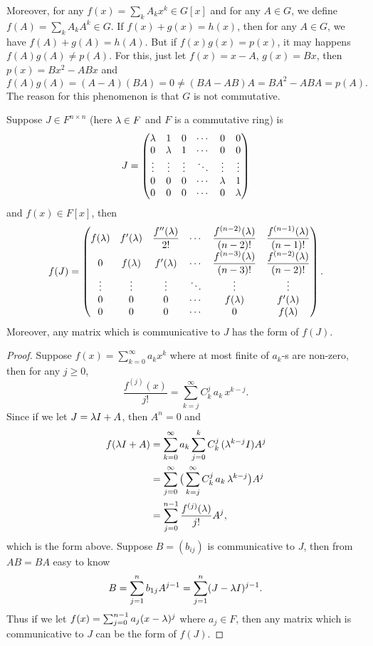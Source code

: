 Moreover, for any $f(x)=\sum_{k} A_kx^k\in G[x]$ and for any $A\in G$, we define $f(A)=\sum_{k} A_k A^k\in G$. If $f(x)+g(x)=h(x)$, then for any $A\in G$, we have $f(A)+g(A)=h(A)$. But if $f(x)g(x)=p(x)$, it may happens $f(A)g(A)\neq p(A)$. For this, just let $f(x)=x-A$, $g(x)=Bx$, then $p(x)=Bx^2-ABx$ and 
\[f(A)g(A)=(A-A)(BA)=0\neq (BA-AB)A=BA^2-ABA=p(A).\]
The reason for this phenomenon is that $G$ is not commutative.
\begin{pro}%
	Suppose $J\in F^{n\times n}$ (here $\lambda\in F$ and $F$ is a commutative ring) is
	\[J=\begin{pmatrix}
	\lambda & 1 & 0 & \cdots & 0 & 0\\
	0   &\lambda& 1 & \cdots & 0 & 0\\
	\vdots   &\vdots& \vdots & \ddots & \vdots & \vdots\\
	0   &0& 0 & \cdots & \lambda & 1\\
	0   &0& 0 & \cdots & 0 & \lambda
	\end{pmatrix}\]
	and $f(x)\in F[x]$, then 
	\[f(J)=\begin{pmatrix}
	f(\lambda) & f'(\lambda) & \dfrac{f''(\lambda)}{2!} & \cdots & \dfrac{f^{(n-2)}(\lambda)}{(n-2)!} &
	\dfrac{f^{(n-1)}(\lambda)}{(n-1)!}\\
	0 & f(\lambda) & f'(\lambda) & \cdots & \dfrac{f^{(n-3)}(\lambda)}{(n-3)!} &
	\dfrac{f^{(n-2)}(\lambda)}{(n-2)!}\\
	\vdots & \vdots & \vdots & \ddots & \vdots& \vdots\\
	0 & 0 & 0 & \cdots & f(\lambda) & f'(\lambda)\\
	0 & 0 & 0 & \cdots & 0 & f(\lambda)\end{pmatrix}.\]
	Moreover, any matrix which is communicative to $J$ has the form of $f(J)$.
\end{pro}
\begin{proof}
	Suppose $f(x)=\sum_{k=0}^{\infty} a_k x^k$ where at most finite of $a_k$-s are non-zero, then for any $j\geq 0$, 
	\[\frac{f^{(j)}(x)}{j!}=\sum_{k=j}^{\infty} C_k^j\,a_k\,x^{k-j}.\]
	Since if we let $J=\lambda I+A$, then $A^n=0$ and 
	\begin{align*}
		f(\lambda I+A)&=\sum_{k=0}^{\infty} a_k\sum_{j=0}^k C_k^j\,(\lambda^{k-j} I)A^j\\
		&=\sum_{j=0}^{\infty}\big(\sum_{k=j}^{\infty} C_k^j\,a_k\,\lambda^{k-j}\big) A^j\\
		&=\sum_{j=0}^{n-1}\frac{f^{(j)}(\lambda)}{j!} A^j,
	\end{align*}
	which is the form above. Suppose $B=(b_{ij})$ is communicative to $J$, then from $AB=BA$ easy to know
	\[B=\sum_{j=1}^n b_{1j} A^{j-1}=\sum_{j=1}^n (J-\lambda I)^{j-1}.\]
	Thus if we let $f(x)=\sum_{j=0}^{n-1} a_j (x-\lambda)^j$ where $a_j\in F$, then any matrix which is communicative to $J$ can be the form of $f(J)$.
\end{proof}